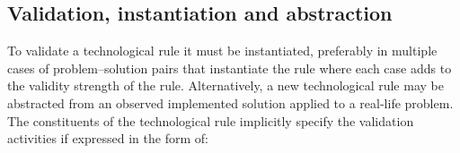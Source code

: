 \documentclass[graybox]{svmult}
\newcommand{\peggy}[1]{\textcolor{blue}{{\it [Peggy says: #1]}}}
\newcommand{\peggy}[1]{}
\begin{document}





 

\subsection{Validation, instantiation and abstraction}

To validate a technological rule it must be instantiated, preferably in multiple cases of problem--solution pairs that instantiate the rule where each case adds to the validity strength of the rule. Alternatively, a new technological rule may be abstracted from an observed implemented solution applied to a real-life problem.
The constituents of the technological rule implicitly specify the validation activities if expressed in the form of:
\end{document}
